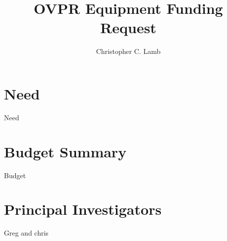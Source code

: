 \documentclass[12pt,letterpaper]{article}
\author{Christopher C. Lamb}
\title{OVPR Equipment Funding Request}
\begin{document}
\maketitle


\section{Need}
Need

\newpage
\section{Budget Summary}
Budget

\newpage
\section{Principal Investigators}
Greg and chris
\end{document}
